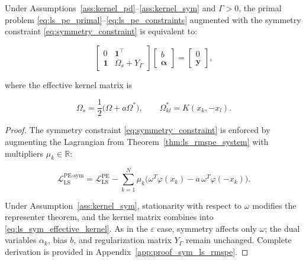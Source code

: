 \documentclass[mathematics,article,submit,pdftex,moreauthors]{Definitions/mdpi}
\begin{document}
\begin{Theorem}\label{thm:sym_ls_rmspe_system}
Under Assumptions~\ref{ass:kernel_pd}--\ref{ass:kernel_sym} and $\Gamma > 0$, 
the primal problem \eqref{eq:ls_pe_primal}--\eqref{eq:ls_pe_constraints} 
augmented with the symmetry constraint \eqref{eq:symmetry_constraint} is equivalent to:
\begin{linenomath}
\begin{equation}\label{eq:ls_sym_pe_system}
\begin{bmatrix}
0 & \mathbf{1}^\top\\
\mathbf{1} & \Omega_s + Y_\Gamma
\end{bmatrix}
\begin{bmatrix}
b\\
\boldsymbol{\alpha}
\end{bmatrix}
=
\begin{bmatrix}
0\\
\mathbf{y}
\end{bmatrix},
\end{equation}
\end{linenomath}
where the effective kernel matrix is
\begin{linenomath}
\begin{equation}\label{eq:ls_sym_effective_kernel}
\Omega_s=\frac{1}{2}\bigl(\Omega+a\Omega^*\bigr),
\qquad
\Omega^*_{kl}=K(x_k,-x_l).
\end{equation}
\end{linenomath}
\end{Theorem}

\begin{proof}
The symmetry constraint \eqref{eq:symmetry_constraint} is enforced by augmenting the Lagrangian from 
Theorem~\ref{thm:ls_rmspe_system} with multipliers $\mu_k \in \mathbb{R}$:
\begin{linenomath}
\begin{equation}\label{eq:ls_sym_lagrangian}
\mathcal{L}_{\mathrm{LS}}^{\mathrm{PE\text{-}sym}}
=
\mathcal{L}_{\mathrm{LS}}^{\mathrm{PE}}
-\sum_{k=1}^N \mu_k\bigl(\omega^T\varphi(x_k)-a\,\omega^T\varphi(-x_k)\bigr).
\end{equation}
\end{linenomath}
Under Assumption~\ref{ass:kernel_sym}, stationarity with respect to $\omega$ modifies the representer theorem, 
and the kernel matrix combines into \eqref{eq:ls_sym_effective_kernel}. 
As in the $\varepsilon$ case, symmetry affects only $\omega$; the dual variables $\alpha_k$, bias $b$, 
and regularization matrix $Y_\Gamma$ remain unchanged.
Complete derivation is provided in Appendix~\ref{app:proof_sym_ls_rmspe}.
\end{proof}
\end{document}
